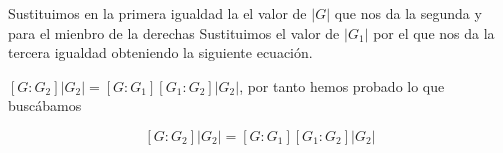 \documentclass[12pt]{article}
\begin{document}
    Sustituimos en la primera igualdad la el valor de $|G|$ que nos da la segunda y para el mienbro de la derechas Sustituimos
    el valor de $|G_1|$ por el que nos da la tercera igualdad obteniendo la siguiente ecuación. 

    $[G:G_2] |G_2| = [G:G_1] [G_1:G_2] |G_2|$, por tanto hemos probado lo que buscábamos

    $$[G:G_2] |G_2| = [G:G_1] [G_1:G_2] |G_2|$$
\end{document}
